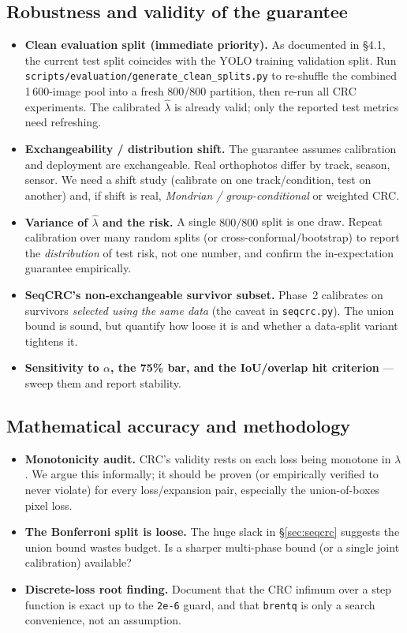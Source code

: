 \documentclass[11pt,a4paper]{article}
\newcommand{\lamhat}{\hat{\lambda}}
\newcommand{\code}[1]{\texttt{\small #1}}
\begin{document}
\subsection{Robustness and validity of the guarantee}
\begin{itemize}[nosep]
  \item \textbf{Clean evaluation split (immediate priority).} As documented in
    \S4.1, the current test split coincides with the YOLO training validation split.
    Run \code{scripts/evaluation/generate\_clean\_splits.py} to re-shuffle the
    combined 1\,600-image pool into a fresh 800/800 partition, then re-run all CRC
    experiments. The calibrated $\lamhat$ is already valid; only the reported test
    metrics need refreshing.
  \item \textbf{Exchangeability / distribution shift.} The guarantee assumes
    calibration and deployment are exchangeable. Real orthophotos differ by
    track, season, sensor. We need a shift study (calibrate on one
    track/condition, test on another) and, if shift is real,
    \emph{Mondrian / group-conditional} or weighted CRC.
  \item \textbf{Variance of $\lamhat$ and the risk.} A single $800/800$ split is
    one draw. Repeat calibration over many random splits (or
    cross-conformal/bootstrap) to report the \emph{distribution} of test risk,
    not one number, and confirm the in-expectation guarantee empirically.
  \item \textbf{SeqCRC's non-exchangeable survivor subset.} Phase~2 calibrates
    on survivors \emph{selected using the same data} (the caveat in
    \code{seqcrc.py}). The union bound is sound, but quantify how loose it is and
    whether a data-split variant tightens it.
  \item \textbf{Sensitivity to $\alpha$, the 75\% bar, and the IoU/overlap hit
    criterion} --- sweep them and report stability.
\end{itemize}

\subsection{Mathematical accuracy and methodology}
\begin{itemize}[nosep]
  \item \textbf{Monotonicity audit.} CRC's validity rests on each loss being
    monotone in $\lambda$. We argue this informally; it should be proven (or
    empirically verified to never violate) for every loss/expansion pair,
    especially the union-of-boxes pixel loss.
  \item \textbf{The Bonferroni split is loose.} The huge slack in
    \S\ref{sec:seqcrc} suggests the union bound wastes budget. Is a sharper
    multi-phase bound (or a single joint calibration) available?
  \item \textbf{Discrete-loss root finding.} Document that the CRC infimum over
    a step function is exact up to the \code{2e-6} guard, and that
    \code{brentq} is only a search convenience, not an assumption.
\end{itemize}
\end{document}
